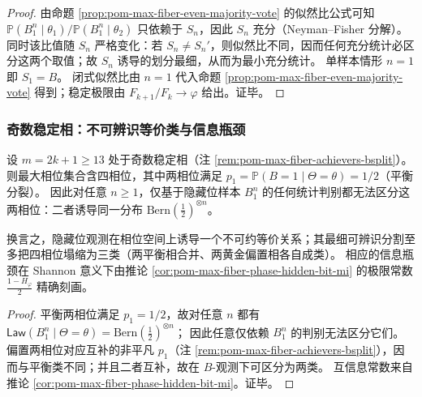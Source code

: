 \begin{proof}
由命题 \ref{prop:pom-max-fiber-even-majority-vote} 的似然比公式可知
\(
\mathbb{P}(B_1^n\mid\theta_1)/\mathbb{P}(B_1^n\mid\theta_2)
\)
只依赖于 \(S_n\)，因此 \(S_n\) 充分（Neyman--Fisher 分解）。
同时该比值随 \(S_n\) 严格变化：若 \(S_n\neq S_n'\)，则似然比不同，因而任何充分统计必区分这两个取值；故 \(S_n\) 诱导的划分最细，从而为最小充分统计。
单样本情形 \(n=1\) 即 \(S_1=B\)。
闭式似然比由 \(n=1\) 代入命题 \ref{prop:pom-max-fiber-even-majority-vote} 得到；稳定极限由 \(F_{k+1}/F_k\to\varphi\) 给出。证毕。
\end{proof}

\subsubsection{奇数稳定相：不可辨识等价类与信息瓶颈}

\begin{proposition}\label{prop:pom-max-fiber-odd-indistinguishability}
设 \(m=2k+1\ge 13\) 处于奇数稳定相（注 \ref{rem:pom-max-fiber-achievers-bsplit}）。
则最大相位集合含四相位，其中两相位满足 \(p_1=\mathbb{P}(B=1\mid\Theta=\theta)=1/2\)（平衡分裂）。
因此对任意 \(n\ge 1\)，仅基于隐藏位样本 \(B_1^n\) 的任何统计判别都无法区分这两相位：二者诱导同一分布 \(\mathrm{Bern}(\tfrac12)^{\otimes n}\)。
\par
换言之，隐藏位观测在相位空间上诱导一个不可约等价关系；其最细可辨识分割至多把四相位塌缩为三类（两平衡相合并、两黄金偏置相各自成类）。
相应的信息瓶颈在 Shannon 意义下由推论 \ref{cor:pom-max-fiber-phase-hidden-bit-mi} 的极限常数 \(\frac{1-H_\varphi}{2}\) 精确刻画。
\end{proposition}

\begin{proof}
平衡两相位满足 \(p_1=1/2\)，故对任意 \(n\) 都有
\(
\mathsf{Law}(B_1^n\mid\Theta=\theta)=\mathrm{Bern}(\tfrac12)^{\otimes n}
\)；
因此任意仅依赖 \(B_1^n\) 的判别无法区分它们。
偏置两相位对应互补的非平凡 \(p_1\)（注 \ref{rem:pom-max-fiber-achievers-bsplit}），因而与平衡类不同；并且二者互补，故在 \(B\)-观测下可区分为两类。
互信息常数来自推论 \ref{cor:pom-max-fiber-phase-hidden-bit-mi}。证毕。
\end{proof}





\endinput
